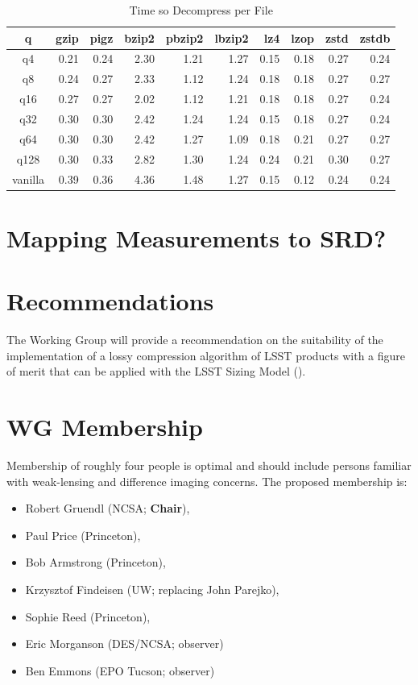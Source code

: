 \begin{table}
\caption{Time so Decompress per File}
\centering
\begin{tabular}[]{crrrrrrrrr}
\hline
 q        &  gzip & pigz & bzip2 & pbzip2 & lbzip2 & lz4 & lzop & zstd & zstdb  \\
\hline
 q4       &    0.21 &   0.24 &   2.30 &   1.21 &   1.27 &   0.15 &   0.18 &   0.27 &   0.24  \\
 q8       &    0.24 &   0.27 &   2.33 &   1.12 &   1.24 &   0.18 &   0.18 &   0.27 &   0.27  \\
 q16      &    0.27 &   0.27 &   2.02 &   1.12 &   1.21 &   0.18 &   0.18 &   0.27 &   0.24  \\
 q32      &    0.30 &   0.30 &   2.42 &   1.24 &   1.24 &   0.15 &   0.18 &   0.27 &   0.24  \\
 q64      &    0.30 &   0.30 &   2.42 &   1.27 &   1.09 &   0.18 &   0.21 &   0.27 &   0.27  \\
 q128     &    0.30 &   0.33 &   2.82 &   1.30 &   1.24 &   0.24 &   0.21 &   0.30 &   0.27  \\
 vanilla  &    0.39 &   0.36 &   4.36 &   1.48 &   1.27 &   0.15 &   0.12 &   0.24 &   0.24  \\
\hline
\end{tabular}
\label{timing_decompress}
\end{table}


\section{Mapping Measurements to SRD?}


\section{Recommendations}

The Working Group will provide a recommendation on the suitability of the implementation
of a lossy compression algorithm of LSST products with a figure of merit that can be 
applied with the LSST Sizing Model ().


\section{WG Membership}

Membership of roughly four people is optimal and should include persons familiar 
with weak-lensing and difference imaging concerns.
The proposed membership is:

\begin{itemize}
    \item Robert Gruendl (NCSA; \textbf{Chair}),
    \item Paul Price (Princeton),
    \item Bob Armstrong (Princeton),
    \item Krzysztof Findeisen (UW; replacing John Parejko),
    \item Sophie Reed (Princeton),
    \item Eric Morganson (DES/NCSA; observer)
    \item Ben Emmons (EPO Tucson; observer)
\end{itemize}

